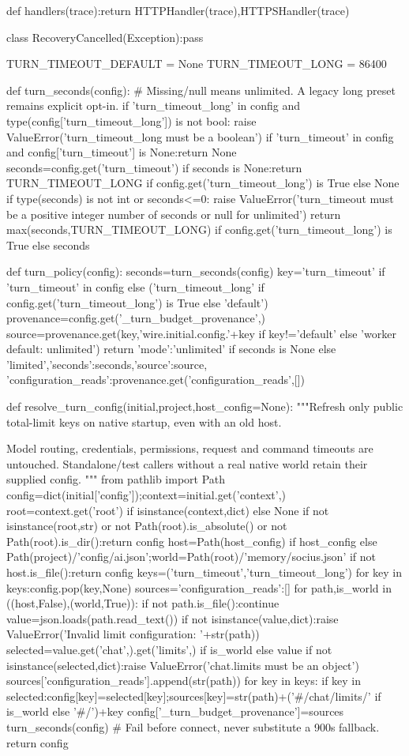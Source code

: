 def handlers(trace):return HTTPHandler(trace),HTTPSHandler(trace)


class RecoveryCancelled(Exception):pass


TURN_TIMEOUT_DEFAULT = None
TURN_TIMEOUT_LONG = 86400

def turn_seconds(config):
    # Missing/null means unlimited. A legacy long preset remains explicit opt-in.
    if 'turn_timeout_long' in config and type(config['turn_timeout_long']) is not bool:
        raise ValueError('turn_timeout_long must be a boolean')
    if 'turn_timeout' in config and config['turn_timeout'] is None:return None
    seconds=config.get('turn_timeout')
    if seconds is None:return TURN_TIMEOUT_LONG if config.get('turn_timeout_long') is True else None
    if type(seconds) is not int or seconds<=0:
        raise ValueError('turn_timeout must be a positive integer number of seconds or null for unlimited')
    return max(seconds,TURN_TIMEOUT_LONG) if config.get('turn_timeout_long') is True else seconds

def turn_policy(config):
    seconds=turn_seconds(config)
    key='turn_timeout' if 'turn_timeout' in config else ('turn_timeout_long' if config.get('turn_timeout_long') is True else 'default')
    provenance=config.get('_turn_budget_provenance',{})
    source=provenance.get(key,'wire.initial.config.'+key if key!='default' else 'worker default: unlimited')
    return {'mode':'unlimited' if seconds is None else 'limited','seconds':seconds,'source':source,
            'configuration_reads':provenance.get('configuration_reads',[])}

def resolve_turn_config(initial,project,host_config=None):
    """Refresh only public total-limit keys on native startup, even with an old host.

    Model routing, credentials, permissions, request and command timeouts are untouched.
    Standalone/test callers without a real native world retain their supplied config.
    """
    from pathlib import Path
    config=dict(initial['config']);context=initial.get('context',{})
    root=context.get('root') if isinstance(context,dict) else None
    if not isinstance(root,str) or not Path(root).is_absolute() or not Path(root).is_dir():return config
    host=Path(host_config) if host_config else Path(project)/'config/ai.json';world=Path(root)/'memory/socius.json'
    if not host.is_file():return config
    keys=('turn_timeout','turn_timeout_long')
    for key in keys:config.pop(key,None)
    sources={'configuration_reads':[]}
    for path,is_world in ((host,False),(world,True)):
        if not path.is_file():continue
        value=json.loads(path.read_text())
        if not isinstance(value,dict):raise ValueError('Invalid limit configuration: '+str(path))
        selected=value.get('chat',{}).get('limits',{}) if is_world else value
        if not isinstance(selected,dict):raise ValueError('chat.limits must be an object')
        sources['configuration_reads'].append(str(path))
        for key in keys:
            if key in selected:config[key]=selected[key];sources[key]=str(path)+('#/chat/limits/' if is_world else '#/')+key
    config['_turn_budget_provenance']=sources
    turn_seconds(config) # Fail before connect, never substitute a 900s fallback.
    return config

